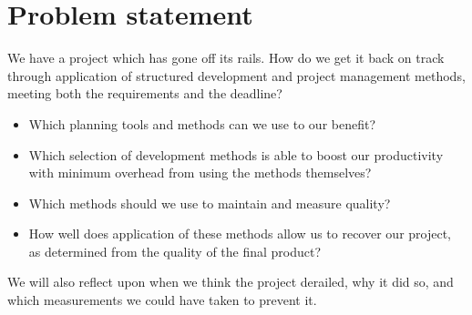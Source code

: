 \section{Problem statement}
We have a project which has gone off its rails. How do we get it back on track through application of structured development and project management methods, meeting both the requirements and the deadline?
\begin{itemize}
\item Which planning tools and methods can we use to our benefit?
\item Which selection of development methods is able to boost our productivity with minimum overhead from using the methods themselves?
\item Which methods should we use to maintain and measure quality?
\item How well does application of these methods allow us to recover our project, as determined from the quality of the final product?
\end{itemize}
We will also reflect upon when we think the project derailed, why it did so, and which measurements we could have taken to prevent it.
\newpage